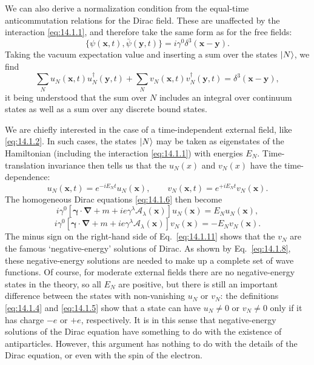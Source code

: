 We can also derive a normalization condition from the equal-time
anticommutation relations for the Dirac field. These are unaffected by the
interaction \eqref{eq:14.1.1}, and therefore take the same form as for the free
fields:
\begin{equation}
  \{\psi(\mathbf x,t),\bar\psi(\mathbf y,t)\}
  =i\gamma^0\delta^3(\mathbf x-\mathbf y).
  \tag{14.1.7}\label{eq:14.1.7}
\end{equation}
Taking the vacuum expectation value and inserting a sum over the states
$\lvert N\rangle$, we find
\begin{equation}
  \sum_Nu_N(\mathbf x,t)u_N^\dagger(\mathbf y,t)
  +\sum_Nv_N(\mathbf x,t)v_N^\dagger(\mathbf y,t)
  =\delta^3(\mathbf x-\mathbf y),
  \tag{14.1.8}\label{eq:14.1.8}
\end{equation}
it being understood that the sum over $N$ includes an integral over continuum
states as well as a sum over any discrete bound states.

We are chiefly interested in the case of a time-independent external field,
like \eqref{eq:14.1.2}. In such cases, the states $\lvert N\rangle$ may be taken as
eigenstates of the Hamiltonian (including the interaction \eqref{eq:14.1.1})
with energies $E_N$. Time-translation invariance then tells us that the
$u_N(x)$ and $v_N(x)$ have the time-dependence:
\begin{equation}
  u_N(\mathbf x,t)=e^{-iE_Nt}u_N(\mathbf x),\qquad
  v_N(\mathbf x,t)=e^{+iE_Nt}v_N(\mathbf x).
  \tag{14.1.9}\label{eq:14.1.9}
\end{equation}
The homogeneous Dirac equations \eqref{eq:14.1.6} then become
\begin{equation}
  i\gamma^0\left[\boldsymbol\gamma\cdot\boldsymbol\nabla+m
  +ie\gamma^\lambda\mathcal A_\lambda(\mathbf x)\right]u_N(\mathbf x)
  =E_Nu_N(\mathbf x),
  \tag{14.1.10}\label{eq:14.1.10}
\end{equation}
\begin{equation}
  i\gamma^0\left[\boldsymbol\gamma\cdot\boldsymbol\nabla+m
  +ie\gamma^\lambda\mathcal A_\lambda(\mathbf x)\right]v_N(\mathbf x)
  =-E_Nv_N(\mathbf x).
  \tag{14.1.11}\label{eq:14.1.11}
\end{equation}
The minus sign on the right-hand side of Eq.~\eqref{eq:14.1.11} shows that the
$v_N$ are the famous `negative-energy' solutions of Dirac. As shown by
Eq.~\eqref{eq:14.1.8}, these negative-energy solutions are needed to make up a
complete set of wave functions. Of course, for moderate external fields there
are no negative-energy states in the theory, so all $E_N$ are positive, but
there is still an important difference between the states with non-vanishing
$u_N$ or $v_N$: the definitions \eqref{eq:14.1.4} and \eqref{eq:14.1.5} show
that a state can have $u_N\ne0$ or $v_N\ne0$ only if it has charge $-e$ or
$+e$, respectively. It is in this sense that negative-energy solutions of the
Dirac equation have something to do with the existence of antiparticles.
However, this argument has nothing to do with the details of the Dirac
equation, or even with the spin of the electron.

